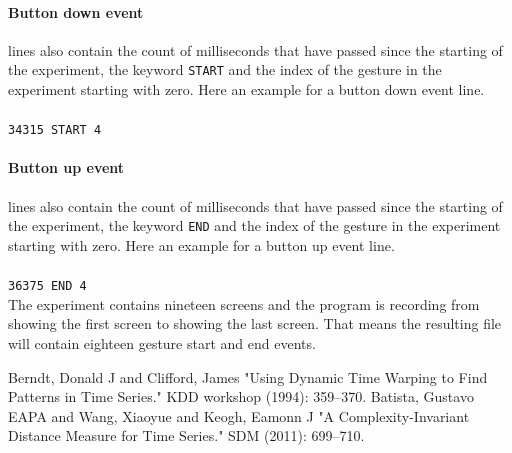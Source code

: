 \documentclass[runningheads,a4paper]{llncs}
\begin{document}
    \paragraph{Button down event} lines also contain the count of milliseconds that have passed since the starting
    of the experiment, the keyword \verb+START+ and the index of the gesture in the experiment starting with zero. Here
    an example for a button down event line.\\\\
    \verb+34315 START 4+

    \paragraph{Button up event} lines also contain the count of milliseconds that have passed since the starting
    of the experiment, the keyword \verb+END+ and the index of the gesture in the experiment starting with zero. Here
    an example for a button up event line.\\\\
    \verb+36375 END 4+\\

    The experiment contains nineteen screens and the program is recording from showing the first screen to showing the
    last screen. That means the resulting file will contain eighteen gesture start and end events.




    \begin{thebibliography}{1}
         Berndt, Donald J and Clifford, James "Using Dynamic Time Warping to Find Patterns in
        Time Series." KDD workshop (1994): 359--370.
         Batista, Gustavo EAPA and Wang, Xiaoyue and Keogh, Eamonn J "A
        Complexity-Invariant Distance Measure for Time Series." SDM (2011): 699--710.
    \end{thebibliography}
\end{document}
